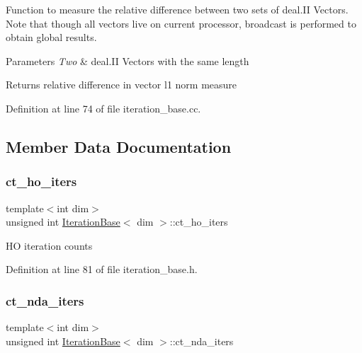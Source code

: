 Function to measure the relative difference between two sets of deal.\+II Vectors. Note that though all vectors live on current processor, broadcast is performed to obtain global results.


\begin{DoxyParams}{Parameters}
{\em Two} & deal.\+II Vectors with the same length \\
\hline
\end{DoxyParams}
\begin{DoxyReturn}{Returns}
relative difference in vector l1 norm measure 
\end{DoxyReturn}


Definition at line 74 of file iteration\+\_\+base.\+cc.



\subsection{Member Data Documentation}
\mbox{\label{class_iteration_base_afd007145fe5b7bfe22012c44c20d31a4}} 
\subsubsection{\texorpdfstring{ct\+\_\+ho\+\_\+iters}{ct\_ho\_iters}}
{\footnotesize\ttfamily template$<$int dim$>$ \\
unsigned int \hyperlink{class_iteration_base}{Iteration\+Base}$<$ dim $>$\+::ct\+\_\+ho\+\_\+iters\hspace{0.3cm}{\ttfamily [protected]}}

HO iteration counts 

Definition at line 81 of file iteration\+\_\+base.\+h.

\mbox{\label{class_iteration_base_a1b4bda01b55383e80b0631fbfc339385}} 
\subsubsection{\texorpdfstring{ct\+\_\+nda\+\_\+iters}{ct\_nda\_iters}}
{\footnotesize\ttfamily template$<$int dim$>$ \\
unsigned int \hyperlink{class_iteration_base}{Iteration\+Base}$<$ dim $>$\+::ct\+\_\+nda\+\_\+iters\hspace{0.3cm}{\ttfamily [protected]}}

